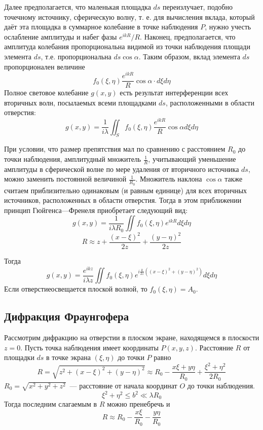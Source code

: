 Далее предполагается, что маленькая площадка $ds$ переизлучает, подобно точечному источнику, сферическую волну, т. е. для вычисления вклада, который даёт эта площадка в суммарное колебание в точке наблюдения $P$,  нужно учесть ослабление амплитуды и набег фазы $e^{ikR}/R$. Наконец, предполагается, что амплитуда колебания пропорциональна видимой из точки наблюдения площади элемента $ds$, т.е. пропорциональна $ds\cos\alpha$. Таким образом, вклад элемента $ds$ пропорционален величине
\[
    f_{0}(\xi, \eta)\frac{e^{ikR}}{R}\cos\alpha\cdot d\xi d\eta
\]
Полное световое колебание $g(x, y)$ есть результат интерференции всех вторичных волн, посылаемых всеми площадками $ds$, расположенными в области отверстия:
\[
    g(x, y) = \frac{1}{i\lambda}\iint_{S} f_{0}(\xi, \eta)\frac{e^{ikR}}{R}\cos\alpha d\xi d\eta
\]

При условии, что размер препятствия мал по сравнению с расстоянием $R_{0}$ до точки наблюдения, амплитудный множитель $\frac{1}{R}$,  учитывающий уменьшение амплитуды в сферической волне по мере удаления от вторичного источника $ds$, можно заменить постоянной величиной $\frac{1}{R_{0}}$. Множитель наклона $\cos\alpha$ также считаем приблизительно одинаковым (и равным единице) для всех вторичных источников, расположенных в области отверстия. Тогда в этом приближении принцип Гюйгенса—Френеля приобретает следующий вид:
\[
    g(x, y) = \frac{1}{i\lambda R_{0}} \iint f_{0}(\xi, \eta)e^{ikR} d\xi d\eta
\]
\[
    R \approx z + \frac{\left(x - \xi\right)^{2}}{2z} + \frac{\left(y - \eta\right)^{2}}{2z}
\]

Тогда
\[
    g(x, y) = \frac{e^{ikz}}{i \lambda z}\iint f_{0}(\xi, \eta)e^{i\frac{k}{2z}\left(\left(x-\xi\right)^{2} + \left(y - \eta\right)^{2}\right)} d\xi d\eta
\]
Если отверстиеосвещается плоской волной, то $f_{0}(\xi, \eta) = A_{0}$.

\subsection{Дифракция Фраунгофера}
Рассмотрим дифракцию на отверстии в плоском экране, находящемся в плоскости $z = 0$. Пусть точка наблюдения имеет координаты $P(x, y, z)$. Расстояние $R$  от площадки $ds$ в точке экрана $(\xi, \eta)$ до точки $P$ равно
\[
    R = \sqrt{z^{2} + \left(x - \xi\right)^{2} + \left(y - \eta\right)^{2}}\approx R_{0} - \frac{x\xi + y\eta}{R_{0}} + \frac{\xi^{2} + \eta^{2}}{2R_{0}}
\]
$R_{0} = \sqrt{x^{2} + y^{2} + z^{2}}$~--- расстояние от начала координат $O$ до точки наблюдения.
\[
    \xi^{2} + \eta^{2} \le b^{2} \ll \lambda R_{0}
\]
Тогда последним слагаемым в $R$ можно пренебречь и
\[
    R\approx R_{0} -\frac{x\xi}{R_{0}} - \frac{y\eta}{R_{0}}
\]

